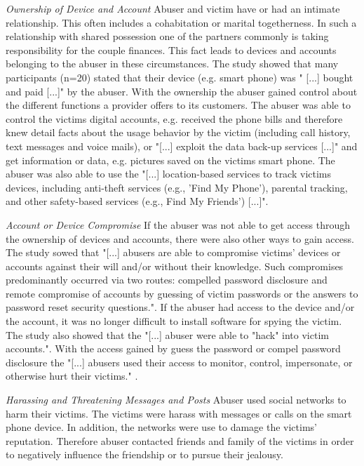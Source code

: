 \textit{Ownership of Device and Account}
Abuser and victim have or had an intimate relationship. This often includes a cohabitation or  marital togetherness. In such a relationship with shared possession one of the partners commonly is taking responsibility for the couple finances. This fact leads to devices and accounts belonging to the abuser in these circumstances.
The study showed that many participants (n=20) stated that their device (e.g. smart phone) was " [...] bought and paid [...]" by the abuser. 
With the ownership the abuser gained control about the different functions a provider offers to its customers. The abuser was able to control the victims digital accounts, e.g. received the phone bills and therefore knew detail facts about the usage behavior by the victim (including call history, text messages and voice mails), or "[...] exploit the data back-up services [...]" and get information or data, e.g. pictures saved on the victims smart phone. The abuser was also able to use the "[...] location-based services to track victims devices, including anti-theft services (e.g., 'Find My Phone'), parental tracking, and other safety-based services (e.g., Find My Friends') [...]".

\textit{Account or Device Compromise}
If the abuser was not able to get access through the ownership of devices and accounts, there were also other ways to gain access. The study sowed that "[...] abusers are able to compromise victims' devices or accounts against their will and/or without their knowledge. Such compromises predominantly occurred via two routes: compelled password disclosure and remote compromise of accounts by guessing of victim passwords or the answers to password reset security questions.". If the abuser had access to the device and/or the account, it was no longer difficult to install software for spying the victim.
The study also showed that the "[...] abuser were able to "hack" into victim accounts.". With the access gained by guess the password or compel password disclosure the "[...] abusers used their access to monitor, control, impersonate, or otherwise hurt their victims." \cite{freed2018stalker}.

\textit{Harassing and Threatening Messages and Posts}
Abuser used social networks to harm their victims. The victims were harass with messages or calls on the smart phone device. In addition, the networks were use to damage the victims' reputation.
Therefore abuser contacted friends and family of the victims in order to negatively influence the friendship or to pursue their jealousy.

